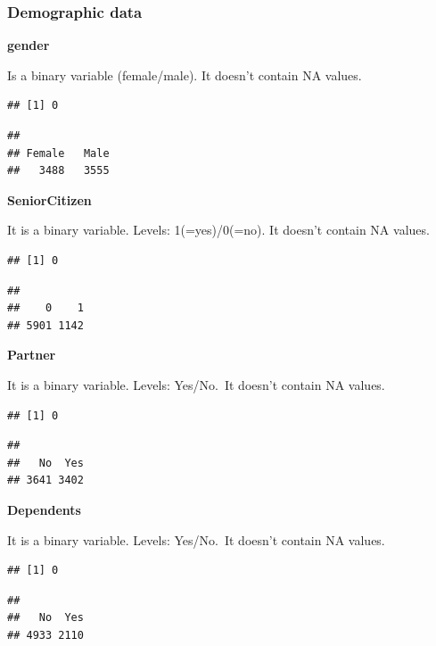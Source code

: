 \documentclass[
  twoside]{article}
\begin{document}
\hypertarget{demographic-data}{%
\subsubsection{\texorpdfstring{\textbf{Demographic
data}}{Demographic data}}\label{demographic-data}}

\textbf{gender}

Is a binary variable (female/male). It doesn't contain NA values.

\begin{verbatim}
## [1] 0
\end{verbatim}

\begin{verbatim}
## 
## Female   Male 
##   3488   3555
\end{verbatim}

\textbf{SeniorCitizen}

It is a binary variable. Levels: 1(=yes)/0(=no). It doesn't contain NA
values.

\begin{verbatim}
## [1] 0
\end{verbatim}

\begin{verbatim}
## 
##    0    1 
## 5901 1142
\end{verbatim}

\textbf{Partner}

It is a binary variable. Levels: Yes/No.~It doesn't contain NA values.

\begin{verbatim}
## [1] 0
\end{verbatim}

\begin{verbatim}
## 
##   No  Yes 
## 3641 3402
\end{verbatim}

\textbf{Dependents}

It is a binary variable. Levels: Yes/No.~It doesn't contain NA values.

\begin{verbatim}
## [1] 0
\end{verbatim}

\begin{verbatim}
## 
##   No  Yes 
## 4933 2110
\end{verbatim}
\end{document}
